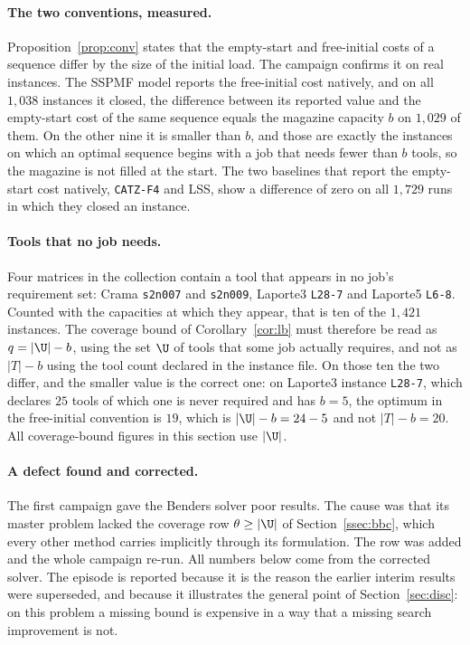 \paragraph{The two conventions, measured.}
Proposition~\ref{prop:conv} states that the empty-start and free-initial costs of a
sequence differ by the size of the initial load. The campaign confirms it on real
instances. The SSPMF model reports the free-initial cost natively, and on all
$1{,}038$ instances it closed, the difference between its reported value and the
empty-start cost of the same sequence equals the magazine capacity $b$ on $1{,}029$ of
them. On the other nine it is smaller than $b$, and those are exactly the instances on
which an optimal sequence begins with a job that needs fewer than $b$ tools, so the
magazine is not filled at the start. The two baselines that report the empty-start cost
natively, \texttt{CATZ-F4} and LSS, show a difference of zero on all $1{,}729$ runs in
which they closed an instance.

\paragraph{Tools that no job needs.}
Four matrices in the collection contain a tool that appears in no job's requirement
set: Crama \texttt{s2n007} and \texttt{s2n009}, Laporte3 \texttt{L28-7} and Laporte5
\texttt{L6-8}. Counted with the capacities at which they appear, that is ten of the
$1{,}421$ instances. The coverage bound of Corollary~\ref{cor:lb} must therefore be read as
$q=\lvert\U\rvert-b$, using the set $\U$ of tools that some job actually requires, and
not as $\lvert T\rvert-b$ using the tool count declared in the instance file. On those
ten the two differ, and the smaller value is the correct one: on Laporte3
instance \texttt{L28-7}, which declares $25$ tools of which one is never required and
has $b=5$, the optimum in the free-initial convention is $19$, which is
$\lvert\U\rvert-b=24-5$ and not $\lvert T\rvert-b=20$. All coverage-bound figures in
this section use $\lvert\U\rvert$.

\paragraph{A defect found and corrected.}
The first campaign gave the Benders solver poor results. The cause was that its master
problem lacked the coverage row $\theta\ge\lvert\U\rvert$ of Section~\ref{ssec:bbc},
which every other method carries implicitly through its formulation. The row was added
and the whole campaign re-run. All numbers below come from the corrected solver. The
episode is reported because it is the reason the earlier interim results were
superseded, and because it illustrates the general point of Section~\ref{sec:disc}: on
this problem a missing bound is expensive in a way that a missing search improvement is
not.

